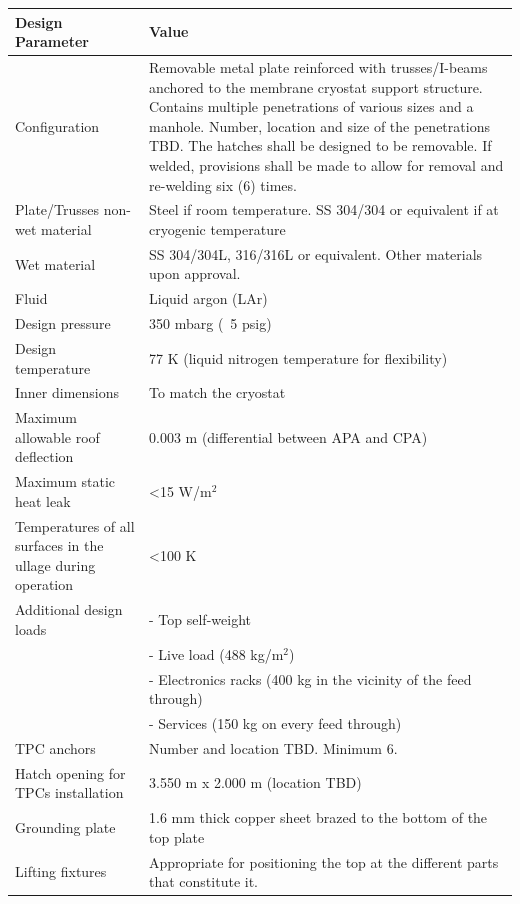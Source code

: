 \begin{table}[htpb]
\centering
\begin{tabular}{|p{}|p{}|} %
\hline
 \textbf{Design Parameter} & \textbf{Value} \\ \hline
 Configuration &  Removable metal plate reinforced with trusses/I-beams anchored to the membrane cryostat support structure. Contains multiple penetrations of various sizes and a manhole. Number, location and size of the penetrations TBD. The hatches shall be designed to be removable. If welded, provisions shall be made to allow for removal and re-welding six (6) times.\\ \hline
Plate/Trusses non-wet material  &  Steel if room temperature.
SS 304/304 or equivalent if at cryogenic temperature
\\ \hline
Wet material  & SS 304/304L, 316/316L or equivalent. 
Other materials upon approval.
 \\ \hline
 Fluid & Liquid argon (LAr) \\ \hline
Design pressure  & 350 mbarg (~5 psig) \\ \hline
Design temperature  & 77 K (liquid nitrogen temperature for flexibility) \\ \hline
Inner dimensions  & To match the cryostat \\ \hline
Maximum allowable roof deflection  & 0.003 m (differential between APA and CPA) \\ \hline
Maximum static heat leak  & \textless 15 W/m$^2$  \\ \hline
 Temperatures of all surfaces in the ullage during operation & \textless 100 K \\ \hline
Additional design loads  &  -	Top self-weight \\
 & -	Live load (488 kg/m$^2$)\\
& -	Electronics racks (400 kg in the vicinity of the feed through)\\
& -	Services (150 kg on every feed through)
\\ \hline
TPC anchors  & %
Number and location TBD. Minimum 6.
 \\ \hline
 Hatch opening for TPCs installation &  3.550 m x 2.000 m (location TBD)\\ \hline %
Grounding plate  &  1.6 mm thick copper sheet brazed to the bottom of the top plate\\ \hline
Lifting fixtures  & Appropriate for positioning the top at the different parts that constitute it. \\ \hline

\end{tabular}
\end{table}
